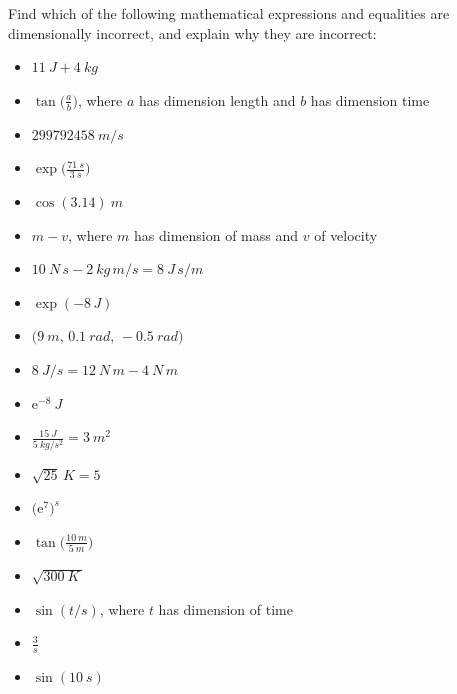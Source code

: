 \documentclass[a4paper,12pt,%
onecolumn,oneside,%
british%
]{memoir}
\newcommand*{\e}{\ensuremath{\mathrm{e}}}
\renewcommand*{\|}[1][]{\nonscript\:#1\vert\nonscript\:\mathopen{}}
\begin{document}
Find which of the following mathematical expressions and equalities are dimensionally incorrect, and explain why they are incorrect:
\begin{itemize}[label=$\triangleright$\enspace,itemsep=1ex]
\item $\displaystyle\qty{11}{J} + \qty{4}{kg}$%
\item $\displaystyle\tan\biggl(\frac{a}{b}\biggr)$, where $a$ has dimension \textsf{length} and $b$ has dimension \textsf{time}%
\item $\displaystyle\qty{299792458}{m/s}$
\item $\displaystyle\exp\biggl(\frac{\qty{71}{s}}{\qty{3}{s}}\biggr)$
\item $\displaystyle\cos(\num{3.14})\:\unit{m}$
\item $\displaystyle m - v$, where $m$ has dimension of \textsf{mass} and $v$ of \textsf{velocity}%
\item $\displaystyle \qty{10}{N\, s}-\qty{2}{kg\, m/s} = \qty{8}{J\, s/m}$
\item $\displaystyle\exp(-8\,\unit{J})$%
\item $\displaystyle\bigl(\qty{9}{m},\, \qty{0.1}{rad},\, -\qty{0.5}{rad}\bigr)$
\item $\displaystyle\qty{8}{J/s}=\qty{12}{N\,m}-\qty{4}{N\,m}$%
\item $\displaystyle\e^{-8}\:\unit{J}$
\item $\displaystyle\frac{\qty{15}{J}}{\qty{5}{kg/s^{2}}} = \qty{3}{m^{2}}$
\item $\displaystyle \sqrt{25}\,\unit{K} = 5$%
\item $\displaystyle\bigl(\e^{7}\bigr)^{\unit{s}}$%
\item $\displaystyle\tan\biggl(\frac{\qty{10}{m}}{\qty{5}{m}}\biggr)$
\item $\displaystyle\sqrt{\qty{300}{K}\,}$
\item $\displaystyle\sin(t/\unit{s})$, where $t$ has dimension of \textsf{time}
\item $\displaystyle\frac{3}{\unit{s}}$
\item $\displaystyle\sin(\qty{10}{s})$%
\end{itemize}
\end{document}
